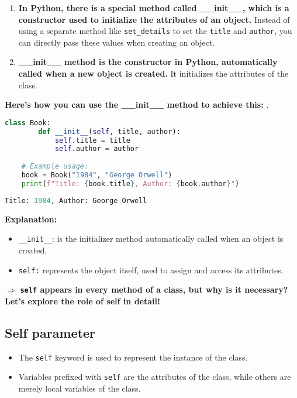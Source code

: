 \begin{tcolorbox}[title=Key Information about \_\_init\_\_ Method, coltitle =black,fonttitle=\large\bfseries,colback=green!5!white,colframe=green!75!black]
	\begin{enumerate}
		\item \textbf{In Python, there is a special method called \_\_init\_\_, which is a constructor used to initialize the attributes of an object.} Instead of using a separate method like \texttt{set\_details} to set the \texttt{title} and \texttt{author}, you can directly pass these values when creating an object.
		\item \textbf{\_\_init\_\_ method is the constructor in Python, automatically called when a new object is created.} It initializes the attributes of the class.
	\end{enumerate}
\end{tcolorbox}

\textbf{Here’s how you can use the \_\_init\_\_ method to achieve this:}
.
\begin{lstlisting}[language=python]
	class Book:
		def __init__(self, title, author):
			self.title = title
			self.author = author
	
	# Example usage:
	book = Book("1984", "George Orwell")
	print(f"Title: {book.title}, Author: {book.author}")
\end{lstlisting}

\begin{lstlisting}[language=python]
	Title: 1984, Author: George Orwell
\end{lstlisting}
\textbf{Explanation:}
\begin{itemize}
	\item \texttt{\_\_init\_\_}: is the initializer method automatically called when an object is created.
	\item \texttt{self:} represents the object itself, used to assign and access its attributes. 
\end{itemize}

$\Rightarrow$ \textbf{\texttt{self} appears in every method of a class, but why is it necessary? Let’s explore the role of self in detail!}

\subsection{Self parameter}
\begin{tcolorbox}[ coltitle =black,fonttitle=\large\bfseries,colback=green!5!white,colframe=green!75!black]
	\begin{itemize}
		\item The \texttt{self} keyword is used to represent the instance of the class.
		\item Variables prefixed with \texttt{self} are the attributes of the class, while others are merely local variables of the class.
	\end{itemize}
\end{tcolorbox}

